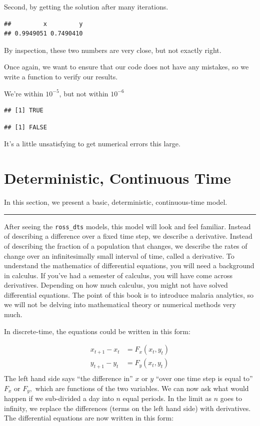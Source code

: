 \documentclass[
]{book}
\begin{document}
Second, by getting the solution after many iterations.

\begin{verbatim}
##         x         y 
## 0.9949051 0.7490410
\end{verbatim}

By inspection, these two numbers are very close, but not exactly right.

Once again, we want to ensure that our code does not have any mistakes, so we write a function to verify our results.

We're within \(10^{-5}\), but not within \(10^{-6}\)

\begin{verbatim}
## [1] TRUE
\end{verbatim}

\begin{verbatim}
## [1] FALSE
\end{verbatim}

It's a little unsatisfying to get numerical errors this large.

\section{Deterministic, Continuous Time}\label{xdeRoss}

In this section, we present a basic, deterministic, continuous-time model.

\begin{center}\rule{0.5\linewidth}{0.5pt}\end{center}

After seeing the \texttt{ross\_dts} models, this model will look and feel familiar. Instead of describing a difference over a fixed time step, we describe a derivative. Instead of describing the fraction of a population that changes, we describe the rates of change over an infinitesimally small interval of time, called a derivative. To understand the mathematics of differential equations, you will need a background in calculus. If you've had a semester of calculus, you will have come across derivatives. Depending on how much calculus, you might not have solved differential equations. The point of this book is to introduce malaria analytics, so we will not be delving into mathematical theory or numerical methods very much.

In discrete-time, the equations could be written in this form:

\[
\begin{array}{rl}
x_{t+1} - x_t &=  F_x (x_t, y_t) \\ 
y_{t+1} - y_t &=  F_y (x_t, y_t)  \\ 
\end{array}
\]
The left hand side says ``the difference in'' \(x\) or \(y\) ``over one time step is equal to'' \(F_x\) or \(F_y,\) which are functions of the two variables. We can now ask what would happen if we sub-divided a day into \(n\) equal periods. In the limit as \(n\) goes to infinity, we replace the differences (terms on the left hand side) with derivatives. The differential equations are now written in this form:
\end{document}
